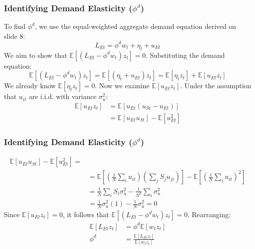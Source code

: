 \documentclass[aspectratio=169,11pt]{beamer}
\begin{document}
\begin{frame}
    \frametitle{Identifying Demand Elasticity ($\phi^d$)}
    To find $\phi^d$, we use the equal-weighted aggregate demand equation derived on slide 8:
    \begin{equation}
        L_{Et} = \phi^d w_t + \eta_t + u_{Et} \tag{41}
    \end{equation}
    We aim to show that $\mathbb{E}[(L_{Et} - \phi^d w_t) z_t] = 0$. Substituting the demand equation:
    \begin{equation}
        \mathbb{E}[(L_{Et} - \phi^d w_t) z_t] = \mathbb{E}[(\eta_t + u_{Et}) z_t] = \mathbb{E}[\eta_t z_t] + \mathbb{E}[u_{Et} z_t]
    \end{equation}
    We already know $\mathbb{E}[\eta_t z_t] = 0$. Now we examine $\mathbb{E}[u_{Et} z_t]$. Under the assumption that $u_{it}$ are i.i.d. with variance $\sigma_u^2$:
    \begin{align*}
        \mathbb{E}[u_{Et} z_t] & = \mathbb{E}[u_{Et} (u_{St} - u_{Et})]             \\
                               & = \mathbb{E}[u_{Et} u_{St}] - \mathbb{E}[u_{Et}^2]
    \end{align*}
    \vspace{0.1cm}
    \hfill \hyperlink{src_psi_identification}{}
\end{frame}
\begin{frame}
    \frametitle{Identifying Demand Elasticity ($\phi^d$)}
    \begin{align*}
        \mathbb{E}[u_{Et} u_{St}] - \mathbb{E}[u_{Et}^2]    =
        \\
         & = \mathbb{E} \left[ \left( \frac{1}{N} \sum_{i} u_{it} \right) \left( \sum_{j} S_j u_{jt} \right) \right] - \mathbb{E} \left[ \left( \frac{1}{N} \sum_{i} u_{it} \right)^2 \right] \\
         & = \frac{1}{N} \sum_{i} S_i \sigma_u^2 - \frac{1}{N^2} \sum_{i} \sigma_u^2                                                                                                          \\
         & = \frac{1}{N} \sigma_u^2 (1) - \frac{1}{N} \sigma_u^2 = 0
    \end{align*}
    Since $\mathbb{E}[u_{Et} z_t] = 0$, it follows that $\mathbb{E}[(L_{Et} - \phi^d w_t) z_t] = 0$. Rearranging:
    \begin{align*}
        \mathbb{E}[L_{Et} z_t] & = \phi^d \mathbb{E}[w_t z_t]                         \\
        \phi^d                 & = \frac{\mathbb{E}[L_{Et} z_t]}{\mathbb{E}[w_t z_t]}
    \end{align*}
    \vspace{0.1cm}
    \hfill
\end{frame}
\end{document}
